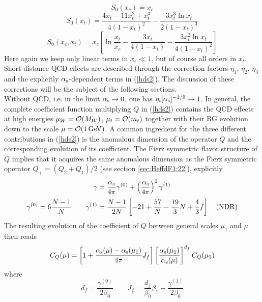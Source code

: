 \begin{equation}\label{s0c}
S_0(x_c)\doteq x_c
\end{equation}
\begin{equation}\label{s0t}
S_0(x_t)=\frac{4x_t-11x^2_t+x^3_t}{4(1-x_t)^2}-
 \frac{3x^3_t \ln x_t}{2(1-x_t)^3}
\end{equation}
\begin{equation}\label{s0ct}
S_0(x_c, x_t)=x_c\left[\ln\frac{x_t}{x_c}-\frac{3x_t}{4(1-x_t)}-
 \frac{3 x^2_t\ln x_t}{4(1-x_t)^2}\right]
\end{equation}
Here again we keep only linear terms in $x_c\ll 1$, but of course
all orders in $x_t$.
\\
Short-distance QCD effects are described through the correction
factors $\eta_1$, $\eta_2$, $\eta_3$ and the explicitly
$\alpha_{\rm s}$-dependent terms in (\ref{hds2}). The discussion of
these corrections will be the subject of the following sections.
\\
Without QCD, i.e. in the limit $\alpha_{\rm s}\to 0$, one has
$\eta_i [\alpha_{\rm s}]^{-2/9}\to 1$. In general, the complete
coefficient function multiplying $Q$ in (\ref{hds2}) contains the
QCD effects at high energies $\mu_W={\cal O}(M_W)$,
$\mu_t={\cal O}(m_t)$ together with their RG evolution down to the
scale $\mu={\cal O}(1\, {\rm GeV})$. A common ingredient for the three
different contributions in (\ref{hds2}) is the anomalous dimension
of the operator $Q$ and the corresponding evolution of its coefficient.
The Fierz symmetric flavor structure of $Q$ implies that it acquires
the same anomalous dimension as the Fierz symmetric operator
$Q_+=(Q_2+Q_1)/2$ (see section \ref{sec:HeffdF1:22}), explicitly
\begin{equation}\label{gamq1}
\gamma=\frac{\alpha_{\rm s}}{4\pi}\gamma^{(0)}+
       \left(\frac{\alpha_{\rm s}}{4\pi}\right)^2\gamma^{(1)}
\end{equation}
\begin{equation}\label{gamq2}
\gamma^{(0)}=6\frac{N-1}{N}\qquad
\gamma^{(1)}=\frac{N-1}{2N}\left[-21+\frac{57}{N}-\frac{19}{3}N+
    \frac{4}{3} f\right]\quad ({\rm NDR})
\end{equation}
The resulting evolution of the coefficient of $Q$ between general
scales $\mu_1$ and $\mu$ then reads
\begin{equation}\label{cqmu}
C_Q(\mu)=\left[1+\frac{\alpha_{\rm s}(\mu)-\alpha_{\rm s}(\mu_1)}{4\pi}J_f\right]
  \left[\frac{\alpha_{\rm s}(\mu_1)}{\alpha_{\rm s}(\mu)}\right]^{d_f}
  C_Q(\mu_1)
\end{equation}
where
\begin{equation}\label{zd0}
d_f=\frac{\gamma^{(0)}}{2\beta_0} \qquad
J_f= \frac{d_f}{\beta_0}\beta_1 - \frac{\gamma^{(1)}}{2\beta_0}
\end{equation}
